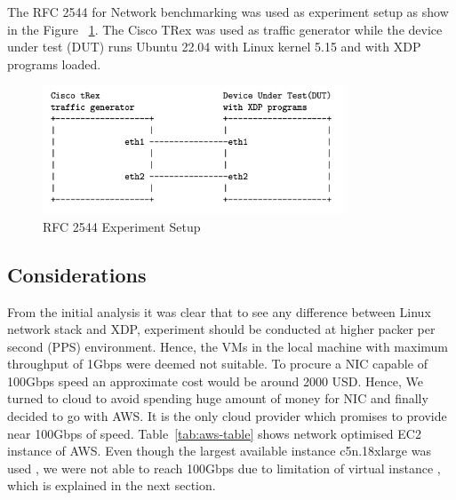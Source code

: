 \documentclass[12pt,titlepage]{article}
\begin{document}
The RFC 2544 \cite{rfc2544} for Network benchmarking was used as experiment setup as show in the Figure ~\ref{fig:setup}. The Cisco TRex \cite{cisco18:_trex_traff_gener} was used as traffic generator while the device under test (DUT) runs Ubuntu 22.04 with Linux kernel 5.15 and with XDP programs loaded. 

\begin{figure}[h]
\centering
\includegraphics[width=0.8\textwidth]{img/exp_setup.png} 
\caption{RFC 2544 Experiment Setup }
\label{fig:setup}
\end{figure}


\subsection{Considerations}

From the initial analysis it was clear that to see any difference between Linux network stack and XDP, experiment should be conducted at higher packer per second (PPS) environment. Hence, the VMs in the local machine with maximum throughput of 1Gbps were deemed not suitable. To procure a NIC capable of 100Gbps speed an approximate cost would be around 2000 USD. Hence, We turned to cloud to avoid spending huge amount of money for NIC and finally decided to go with AWS. It is the only cloud provider which promises to provide near 100Gbps of speed. Table~\ref{tab:aws-table} shows network optimised EC2 instance of AWS. Even though the largest available instance c5n.18xlarge was used , we were not able to reach 100Gbps due to limitation of virtual instance , which is explained in the next section.
\end{document}
